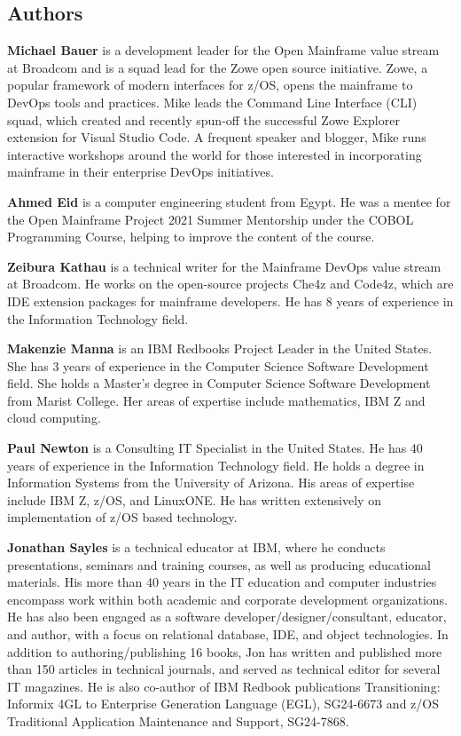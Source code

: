 \hypertarget{authors}{%
\subsection*{Authors}\label{authors}}

\textbf{Michael Bauer} is a development leader for the Open Mainframe
value stream at Broadcom and is a squad lead for the Zowe open source
initiative. Zowe, a popular framework of modern interfaces for z/OS,
opens the mainframe to DevOps tools and practices.  Mike leads the
Command Line Interface (CLI) squad, which created and recently spun-off
the successful Zowe Explorer extension for Visual Studio Code. A
frequent speaker and blogger, Mike runs interactive workshops around the
world for those interested in incorporating mainframe in their
enterprise DevOps initiatives.

\textbf{Ahmed Eid} is a computer engineering student from Egypt. He was 
a mentee for the Open Mainframe Project 2021 Summer Mentorship under the 
COBOL Programming Course, helping to improve the content of the course.

\textbf{Zeibura Kathau} is a technical writer for the Mainframe DevOps
value stream at Broadcom. He works on the open-source projects Che4z and 
Code4z, which are IDE extension packages for mainframe developers. He has 
8 years of experience in the Information Technology field.

\textbf{Makenzie Manna} is an IBM Redbooks Project Leader in the United
States. She has 3 years of experience in the Computer Science Software
Development field. She holds a Master's degree in Computer Science
Software Development from Marist College. Her areas of expertise include
mathematics, IBM Z and cloud computing.

\textbf{Paul Newton} is a Consulting IT Specialist in the United States.
He has 40 years of experience in the Information Technology field. He
holds a degree in Information Systems from the University of Arizona.
His areas of expertise include IBM Z, z/OS, and LinuxONE. He has written
extensively on implementation of z/OS based technology.

\textbf{Jonathan Sayles} is a technical educator at IBM, where he
conducts presentations, seminars and training courses, as well as
producing educational materials. His more than 40 years in the IT
education and computer industries encompass work within both academic
and corporate development organizations. He has also been engaged as a
software developer/designer/consultant, educator, and author, with a
focus on relational database, IDE, and object technologies. In addition
to authoring/publishing 16 books, Jon has written and published more
than 150 articles in technical journals, and served as technical editor
for several IT magazines. He is also co-author of IBM Redbook
publications Transitioning: Informix 4GL to Enterprise Generation
Language (EGL), SG24-6673 and z/OS Traditional Application Maintenance
and Support, SG24-7868.

